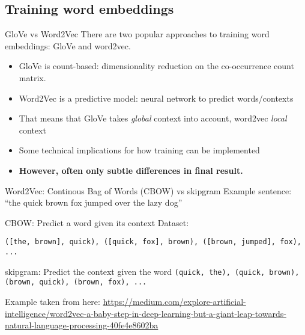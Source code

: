 \subsection{Training word embeddings}

\begin{frame}{GloVe vs Word2Vec}
  There are two popular approaches to training word embeddings: GloVe and word2vec.
  \begin{itemize}
  \item GloVe is count-based: dimensionality reduction on the co-occurrence count matrix.
  \item Word2Vec is a predictive model: neural network to predict words/contexts
  \item That means that GloVe takes \emph{global} context into account, word2vec \emph{local} context
  \item Some technical implications for how training can be implemented 
  \item \textbf{However, often only subtle differences in final result.}
  \end{itemize}
\end{frame}



\begin{frame}{Word2Vec: Continous Bag of Words (CBOW) vs skipgram}
  Example sentence: ``the quick brown fox jumped over the lazy dog''
  \begin{block}{CBOW: Predict a word given its context}
    Dataset:
    
    \texttt{([the, brown], quick), ([quick, fox], brown), ([brown, jumped], fox), ...}
  \end{block}
  
  \pause
  
  
  \begin{block}{skipgram: Predict the context given the word}	
    \texttt{(quick, the), (quick, brown), (brown, quick), (brown, fox), ...}
  \end{block}
  
  \tiny{Example taken from here: \url{https://medium.com/explore-artificial-intelligence/word2vec-a-baby-step-in-deep-learning-but-a-giant-leap-towards-natural-language-processing-40fe4e8602ba}}
\end{frame}



